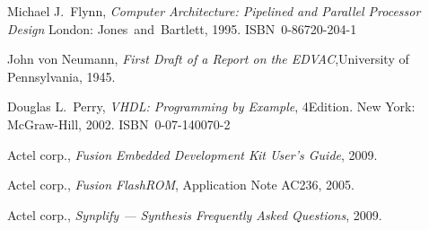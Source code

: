 \documentclass[12pt,a4paper]{article} %
\begin{document}
	
	\clearpage
	\raggedright
	\begin{thebibliography}{9}
			Michael J.~Flynn,
			\textit{Computer Architecture: Pipelined and Parallel Processor Design}
			\linebreak[3]
			London: Jones~and~Bartlett, 1995. ISBN~0-86720-204-1
		
			John von Neumann,
			\textit{First Draft of a Report on the EDVAC},\linebreak[2]
			University of Pennsylvania, 1945.
		
			Douglas L.~Perry,
			\textit{VHDL: Programming by Example}, 4\nth Edition. \linebreak[2]
			New York: McGraw-Hill, 2002. ISBN~0-07-140070-2
		
			Actel corp.,
			\textit{Fusion Embedded Development Kit User's Guide}, %
			2009.
		
			Actel corp.,
			\textit{Fusion FlashROM}, Application Note AC236, %
			2005.
		
			Actel corp.,
			\textit{Synplify — Synthesis Frequently Asked Questions}, %
			2009.
		
		
	\end{thebibliography}
	
\end{document}
